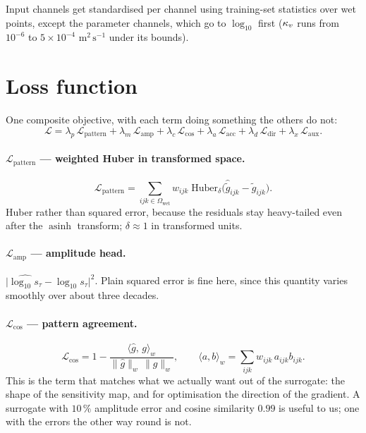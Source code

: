 Input channels get standardised per channel using training-set statistics over
wet points, except the parameter channels, which go to $\log_{10}$ first
($\kappa_{v}$ runs from $10^{-6}$ to $5\times10^{-4}$ $\mathrm{m^{2}\,s^{-1}}$ under
its  bounds).

\section{Loss function}
\label{sec:loss}

One composite objective, with each term doing something the others do not:
\begin{equation}
\mathcal{L}
= \lambda_{p}\,\mathcal{L}_{\text{pattern}}
+ \lambda_{m}\,\mathcal{L}_{\text{amp}}
+ \lambda_{c}\,\mathcal{L}_{\cos}
+ \lambda_{a}\,\mathcal{L}_{\text{acc}}
+ \lambda_{d}\,\mathcal{L}_{\text{dir}}
+ \lambda_{x}\,\mathcal{L}_{\text{aux}} .
\end{equation}

\paragraph{$\mathcal{L}_{\text{pattern}}$ --- weighted Huber in transformed space.}
\begin{equation}
\mathcal{L}_{\text{pattern}}
= \sum_{ijk\in\Omega_{\text{wet}}} w_{ijk}\;
  \mathrm{Huber}_{\delta}\!\big(\hat{\tilde{g}}_{ijk}-\tilde{g}_{ijk}\big).
\end{equation}
Huber rather than squared error, because the residuals stay heavy-tailed even
after the $\operatorname{asinh}$ transform; $\delta\approx1$ in transformed
units.

\paragraph{$\mathcal{L}_{\text{amp}}$ --- amplitude head.}
$\big|\widehat{\log_{10}s_\tau}-\log_{10}s_\tau\big|^{2}$. Plain squared error
is fine here, since this quantity varies smoothly over about three decades.

\paragraph{$\mathcal{L}_{\cos}$ --- pattern agreement.}
\begin{equation}
\mathcal{L}_{\cos}
= 1 - \frac{\langle \hat{g},\,g\rangle_{w}}
            {\|\hat{g}\|_{w}\,\|g\|_{w}},
\qquad
\langle a,b\rangle_{w}=\sum_{ijk}w_{ijk}\,a_{ijk}b_{ijk}.
\end{equation}
This is the term that matches what we actually want out of the surrogate: the
shape of the sensitivity map, and for optimisation the direction of the
gradient. A surrogate with $10\,\%$ amplitude error and cosine similarity
$0.99$ is useful to us; one with the errors the other way round is not.

